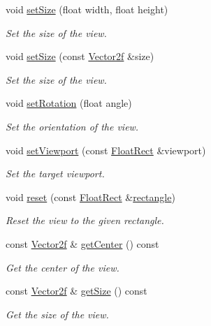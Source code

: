 \begin{DoxyCompactItemize}
void \hyperlink{classsf_1_1_view_a9525b73fe9fbaceb9568faf56b399dab}{set\+Size} (float width, float height)
\begin{DoxyCompactList}\small\item\em Set the size of the view. \end{DoxyCompactList}\item 
void \hyperlink{classsf_1_1_view_a9e08d471ce21aa0e69ce55ff9de66d29}{set\+Size} (const \hyperlink{classsf_1_1_vector2}{Vector2f} \&size)
\begin{DoxyCompactList}\small\item\em Set the size of the view. \end{DoxyCompactList}\item 
void \hyperlink{classsf_1_1_view_a24d0503c9c51f5ef5918612786d325c1}{set\+Rotation} (float angle)
\begin{DoxyCompactList}\small\item\em Set the orientation of the view. \end{DoxyCompactList}\item 
void \hyperlink{classsf_1_1_view_a8eaec46b7d332fe834f016d0187d4b4a}{set\+Viewport} (const \hyperlink{classsf_1_1_rect}{Float\+Rect} \&viewport)
\begin{DoxyCompactList}\small\item\em Set the target viewport. \end{DoxyCompactList}\item 
void \hyperlink{classsf_1_1_view_ac95b636eafab3922b7e8304fb6c00d7d}{reset} (const \hyperlink{classsf_1_1_rect}{Float\+Rect} \&\hyperlink{structrectangle}{rectangle})
\begin{DoxyCompactList}\small\item\em Reset the view to the given rectangle. \end{DoxyCompactList}\item 
const \hyperlink{classsf_1_1_vector2}{Vector2f} \& \hyperlink{classsf_1_1_view_adae81dede405b91bb3c487e28f536fe9}{get\+Center} () const 
\begin{DoxyCompactList}\small\item\em Get the center of the view. \end{DoxyCompactList}\item 
const \hyperlink{classsf_1_1_vector2}{Vector2f} \& \hyperlink{classsf_1_1_view_aa130cf34676d715242bee661537a6257}{get\+Size} () const 
\begin{DoxyCompactList}\small\item\em Get the size of the view. \end{DoxyCompactList}\item 

\end{DoxyCompactItemize}
